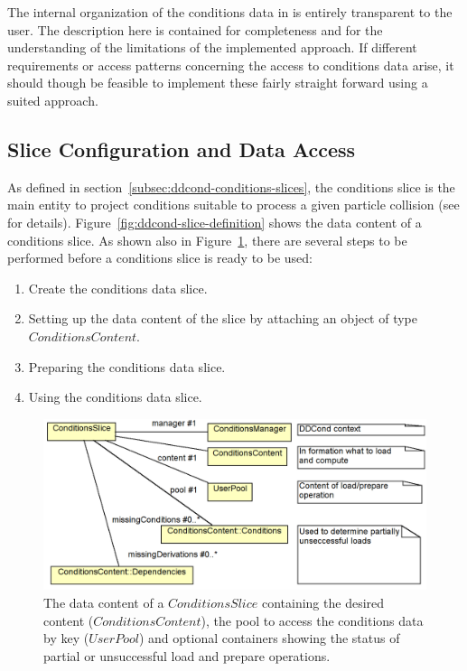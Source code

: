 \documentclass[10pt,a4paper]{article}
\begin{document}
\noindent
The internal organization of the conditions data in \DDC is entirely 
transparent to the user. The description here is contained for
completeness and for the understanding of the limitations of the implemented
approach. If different requirements or access patterns concerning the 
access to conditions data arise, it should though be feasible to implement
these fairly straight forward using a suited approach.

\subsection{Slice Configuration and Data Access}
\label{subsec:ddcond-data-access}

\noindent
As defined in section~\ref{subsec:ddcond-conditions-slices}, the conditions slice
is the main entity to project conditions suitable to process a given particle
collision (see 
for details). Figure~\ref{fig:ddcond-slice-definition} shows the data content of a 
conditions slice.
As shown also in Figure~\ref{fig:ddcond-slice-usage}, there are 
several steps to be performed before a conditions slice is ready to be used:
\begin{enumerate}\itemcompact
\item Create the conditions data slice.
\item Setting up the data content of the slice by attaching an object of type
      $ConditionsContent$.
\item Preparing the conditions data slice.
\item Using the conditions data slice.
\end{enumerate}

\begin{figure}[h]
  \begin{center}\includegraphics[width=12cm] {DDCond-ConditionsSlice}
    \caption{The data content of a $ConditionsSlice$ containing the 
             desired content ($ConditionsContent$), the pool to access the
             conditions data by key ($UserPool$) and optional containers
             showing the status of partial or unsuccessful load and prepare operations.}
    \label{fig:ddcond-slice-usage}
  \end{center}
\end{figure}
\end{document}
